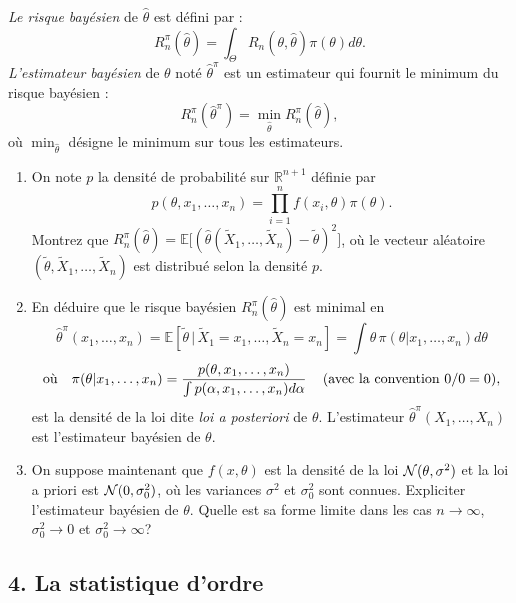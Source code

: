 \documentclass[a4paper,11pt,fleqn]{article}
\newcommand{\R}{\ensuremath{\mathbb{R}}}
\newcommand{\E}{\ensuremath{\mathbb{E}}}
\newcommand{\1}{\ensuremath{\mathbbm{1}}}
\newcommand{\cro}[1]{\left[#1\right]}
\begin{document}
{\it Le risque bay\'esien} de $\hat\theta$ est d\'efini par :
$$R^{\pi}_n(\hat \theta)=\int_{\Theta}R_{n}(\theta,\hat\theta)\pi(\theta) d\theta.$$
{\it L'estimateur bay\'esien} de $\theta$ not\'e $\hat\theta^\pi$ est un estimateur qui fournit le minimum du risque bay\'esien :
$$
R^{\pi}_n(\hat\theta^\pi) = \min_{\hat\theta} R^{\pi}_n(\hat \theta),
$$
o\`u $\min_{\hat\theta}$ d\'esigne le minimum sur tous les estimateurs.
\begin{enumerate}
\item On note $p$ la densit\'e de probabilit\'e sur $\R^{n+1}$ d\'efinie par $$p(\theta,x_{1},\ldots,x_{n})=\prod_{i=1}^n f(x_i,\theta)\pi(\theta).$$ Montrez que %
$R^{\pi}_n(\hat\theta)=\E \big[(\hat\theta(\tilde X_{1},\ldots,\tilde X_{n})-\tilde\theta)^2\big]$, o\`u le vecteur al\'eatoire $(\tilde\theta,\tilde X_{1},\ldots,\tilde X_{n})$ est distribu\'e selon la densit\'e $p$.
\item En d\'eduire que le risque bay\'esien $R^{\pi}_n(\hat\theta)$ est minimal en
$$\hat\theta^\pi(x_{1},\ldots,x_{n})=\E\cro{\tilde \theta\,\vert\, \tilde X_{1}=x_{1},\ldots,\tilde X_{n}=x_{n}}=\int \theta\,\pi(\theta|x_{1},\ldots,x_{n})d\theta$$
$$\textrm{o\`u}\quad \pi(\theta|x_{1},\ldots,x_{n})={p(\theta,x_{1},\ldots,x_{n})\over \int p(\alpha,x_{1},\ldots,x_{n})d\alpha}\,\quad (\textrm{avec la convention }0/0=0),$$
est la densit\'e de la loi dite {\it loi a posteriori} de $\theta$. L'estimateur $\hat\theta^{\pi}(X_{1},\ldots,X_{n})$ est  l'estimateur bay\'esien de $\theta$.
\item On suppose maintenant que $f(x,\theta)$ est la densit\'e de la loi ${\cal N}(\theta, \sigma^2)$ et la loi a priori est ${\cal N}(0, \sigma_0^2)$, o\`u les variances $\sigma^2$ et  $\sigma_0^2$ sont connues. Expliciter l'estimateur bay\'esien de $\theta$. Quelle est sa forme limite dans les cas $n \to \infty$, $\sigma_0^2\to 0$ et $\sigma_0^2\to \infty$?
\end{enumerate}



\subsection*{4. La statistique d'ordre}
\end{document}
